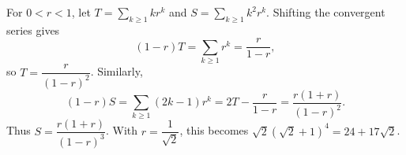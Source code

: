 For $0<r<1$, let $T=\sum_{k\ge1}kr^k$ and $S=\sum_{k\ge1}k^2r^k$. Shifting the convergent series gives
\[(1-r)T=\sum_{k\ge1}r^k=\dfrac{r}{1-r},\]
so $T=\dfrac{r}{(1-r)^2}$. Similarly,
\[(1-r)S=\sum_{k\ge1}(2k-1)r^k=2T-\dfrac{r}{1-r}=\dfrac{r(1+r)}{(1-r)^2}.\]
Thus $S=\dfrac{r(1+r)}{(1-r)^3}$. With $r=\dfrac{1}{\sqrt2}$, this becomes $\sqrt2(\sqrt2+1)^4=\boxed{24+17\sqrt2}$.
